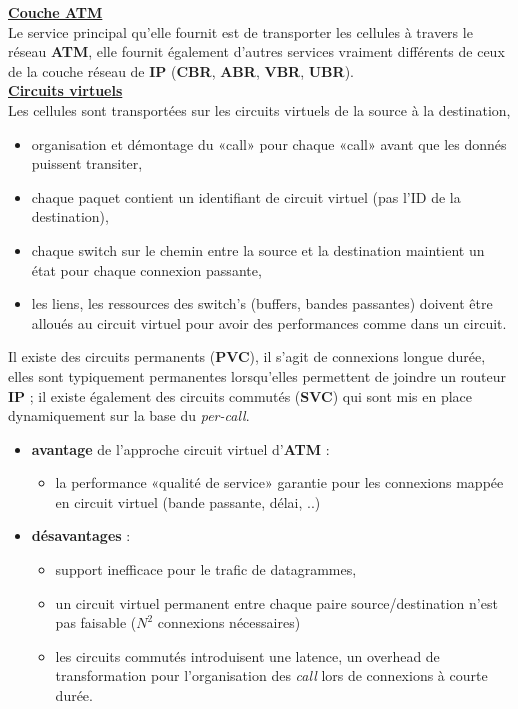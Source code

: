 \documentclass{article}
\newcommand{\stitre}[1]{\noindent\textbf{\underline{#1}} \\}
\begin{document}
\stitre{Couche ATM}

Le service principal qu'elle fournit est de transporter les cellules à travers le réseau \textbf{ATM}, elle 
fournit également d'autres services vraiment différents de ceux de la couche réseau de \textbf{IP} (\textbf{CBR},
\textbf{ABR}, \textbf{VBR}, \textbf{UBR}). \\

\stitre{Circuits virtuels}

\noindent Les cellules sont transportées sur les circuits virtuels de la source à la destination, 
\begin{itemize}
\item organisation et démontage du «call» pour chaque «call» avant que les donnés puissent transiter,
\item chaque paquet contient un identifiant de circuit virtuel (pas l'ID de la destination),
\item chaque switch sur le chemin entre la source et la destination maintient un état pour chaque connexion 
passante,
\item les liens, les ressources des switch's (buffers, bandes passantes) doivent être alloués au circuit virtuel 
pour avoir des performances comme dans un circuit.
\end{itemize}
Il existe des circuits permanents (\textbf{PVC}), il s'agit de connexions longue durée, elles sont typiquement 
permanentes lorsqu'elles permettent de joindre un routeur \textbf{IP} ; il existe également des circuits commutés
(\textbf{SVC}) qui sont mis en place dynamiquement sur la base du \textit{per-call}.
\begin{itemize}
\item \textbf{avantage} de l'approche circuit virtuel d'\textbf{ATM} :
	\begin{itemize}
	\item la performance «qualité de service» garantie pour les connexions mappée en circuit virtuel (bande 
	passante, délai, ..)
	\end{itemize}
\item \textbf{désavantages} :
	\begin{itemize}
	\item support inefficace pour le trafic de datagrammes,
	\item un circuit virtuel permanent entre chaque paire source/destination n'est pas faisable ($N^2$ connexions 
	nécessaires)
	\item les circuits commutés introduisent une latence, un overhead de transformation pour l'organisation des 
	\textit{call} lors de connexions à courte durée. \\
	\end{itemize}
\end{itemize}
\end{document}
